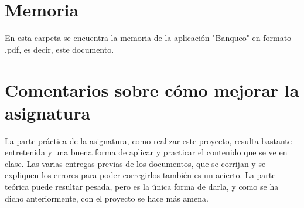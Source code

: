 \documentclass[12pt]{article}
\begin{document}
\section{Memoria}
En esta carpeta se encuentra la memoria de la aplicación "Banqueo" en formato .pdf, es decir, este documento.

\section*{Comentarios sobre cómo mejorar la asignatura}
La parte práctica de la asignatura, como realizar este proyecto, resulta bastante entretenida y una buena forma de aplicar y practicar el contenido que se ve en clase. Las varias entregas previas de los documentos, que se corrijan y se expliquen los errores para poder corregirlos también es un acierto.
La parte teórica puede resultar pesada, pero es la única forma de darla, y como se ha dicho anteriormente, con el proyecto se hace más amena.
\end{document}
